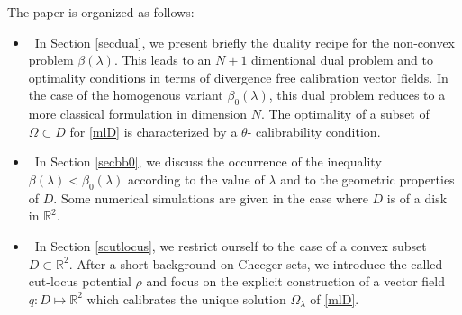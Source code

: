 \documentclass[reqno,11pt]{amsart}
\theoremstyle{definition}
\newtheorem{remark}[theorem]{Remark}
\numberwithin{equation}{section}
\newcommand{\RR}{\mathbb{R}}
\def\R{\mathbb{R}}
\newcommand{\1}{{{\bf 1}\kern-0,28em\rm l}}
\newcommand{\one}{{{\bf 1}\kern-0,28em\rm l}}
\def\O{\Omega}
\def\l{\lambda}
\begin{document}


\medskip
The paper is organized as follows:

\begin{itemize}[leftmargin=6mm]
\item [-]\ In Section  \ref{secdual}, we present briefly the duality recipe for  the non-convex problem $\beta(\l)$. This leads to an $N+1$ dimentional dual  problem  and to optimality conditions in terms of divergence free calibration vector fields.
In the case of the homogenous variant $\beta_0(\l)$,  this dual problem  reduces to a more classical formulation in dimension $N$.
The optimality of a subset of $\O\subset D$ for \eqref{mlD} is characterized by a $\theta$- calibrability condition.
 
 \item[-] \ In Section \ref{secbb0}, we discuss  the occurrence of the inequality $\beta(\l) < \beta_0(\l)$ according to the value of $\l$ and to the geometric properties of $D$.  Some numerical simulations are given in the case where $D$ is of a disk in $\R^2$.
% 

\item[-] \ In Section \ref{scutlocus}, we restrict ourself to the case of a convex subset $D\subset \R^2$. After a short background on Cheeger sets, we introduce the  called cut-locus potential $\rho$ and focus on the explicit  construction of  a vector field  $q: D \mapsto \R^2$ which calibrates the unique solution $\O_\l$ of  \eqref{mlD}.
 
\end{itemize}
\end{document}
